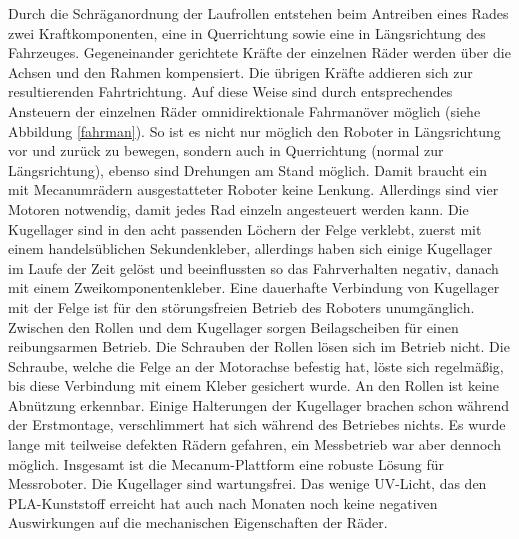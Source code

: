 \documentclass[a4paper,bibtotoc,oneside]{scrbook}
\begin{document}
\noindent Durch die Schräganordnung der Laufrollen entstehen beim Antreiben eines Rades zwei Kraftkomponenten, eine in Querrichtung sowie eine in Längsrichtung des Fahrzeuges. Gegeneinander gerichtete Kräfte der einzelnen Räder werden über die Achsen und den Rahmen kompensiert. Die übrigen Kräfte addieren sich zur resultierenden Fahrtrichtung. Auf diese Weise sind durch entsprechendes Ansteuern der einzelnen Räder omnidirektionale Fahrmanöver möglich (siehe Abbildung \ref{fahrman}). So ist es nicht nur möglich den Roboter in Längsrichtung vor und zurück zu bewegen, sondern auch in Querrichtung (normal zur Längsrichtung), ebenso sind Drehungen am Stand möglich. Damit braucht ein mit Mecanumrädern ausgestatteter Roboter keine Lenkung. Allerdings sind vier Motoren notwendig, damit jedes Rad einzeln angesteuert werden kann.   
Die Kugellager sind in den acht passenden Löchern der Felge verklebt, zuerst mit einem handelsüblichen Sekundenkleber, allerdings haben sich einige Kugellager im Laufe der Zeit gelöst und beeinflussten so das Fahrverhalten negativ, danach mit einem Zweikomponentenkleber. Eine dauerhafte Verbindung von Kugellager mit der Felge ist für den störungsfreien Betrieb des Roboters unumgänglich. 
Zwischen den Rollen und dem Kugellager sorgen Beilagscheiben für einen reibungsarmen Betrieb. 
Die Schrauben der Rollen lösen sich im Betrieb nicht. Die Schraube, welche die Felge an der Motorachse befestig hat, löste sich regelmäßig, bis diese Verbindung mit einem Kleber gesichert wurde.
An den Rollen ist keine Abnützung erkennbar. Einige Halterungen der Kugellager brachen schon während der Erstmontage, verschlimmert hat sich während des Betriebes nichts.
Es wurde lange mit teilweise defekten Rädern gefahren, ein Messbetrieb war aber dennoch möglich. Insgesamt ist die Mecanum-Plattform eine robuste Lösung für Messroboter.
Die Kugellager sind wartungsfrei. Das wenige UV-Licht, das den PLA-Kunststoff erreicht hat auch nach Monaten noch keine negativen Auswirkungen auf die mechanischen Eigenschaften der Räder.
\end{document}
